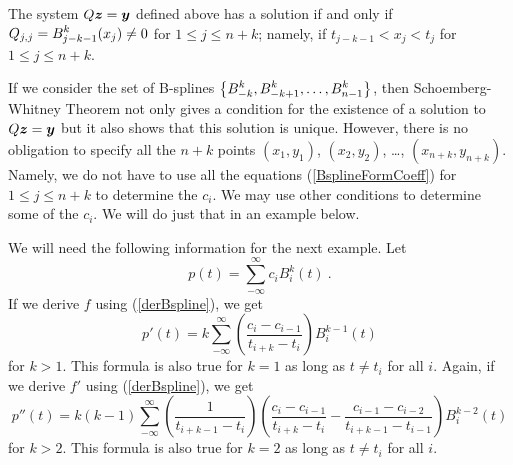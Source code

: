 \begin{prop}
The system $Q\bm{z} = \bm{y}$ defined above has a solution if and
only if $\displaystyle Q_{j,j} = B_{j-k-1}^k(x_j) \neq 0$ for $1\leq j \leq n+k$;
namely, if $t_{j-k-1} < x_j < t_j$ for $1\leq j \leq n+k$.
\end{prop}

If we consider the set of B-splines
$\displaystyle \left\{ B_{-k}^k, B_{-k+1}^k, \ldots , B_{n-1}^k \right\}$,
then Schoemberg-Whitney Theorem not only gives a condition for the
existence of a solution to $Q\bm{z} = \bm{y}$ but it also shows that
this solution is unique.  However, there is no obligation to specify
all the $n+k$ points $(x_1,y_1)$, $(x_2,y_2)$, \ldots,
$(x_{n+k},y_{n+k})$.   Namely, we do not have to use all the equations
(\ref{BsplineFormCoeff}) for $1\leq j \leq n+ k$ to determine the
$c_i$.  We may use other conditions to determine some of the
$c_i$.  We will do just that in an example below.

\begin{rmk}
We will need the following information for the next example.  Let
\[
  p(t) = \sum_{-\infty}^\infty c_i B_i^k(t) \ .
\]
If we derive $f$ using (\ref{derBspline}), we get
\[
p'(t) = k\sum_{-\infty}^\infty \left(\frac{c_i - c_{i-1}}{t_{i+k}-t_i}\right)
B_i^{k-1}(t)
\]
for $k>1$.  This formula is also true for $k=1$ as long as $t\neq t_i$
for all $i$.  Again, if we derive $f'$ using (\ref{derBspline}), we get
\[
p''(t) = k(k-1)
\sum_{-\infty}^\infty\left(\frac{1}{t_{i+k-1}-t_i}\right)
\left(\frac{c_i - c_{i-1}}{t_{i+k}-t_i}
- \frac{c_{i-1} - c_{i-2}}{t_{i+k-1}-t_{i-1}}
\right) B_i^{k-2}(t)
\]
for $k>2$.  This formula is also true for $k=2$ as long as $t\neq t_i$
for all $i$.
\end{rmk}


